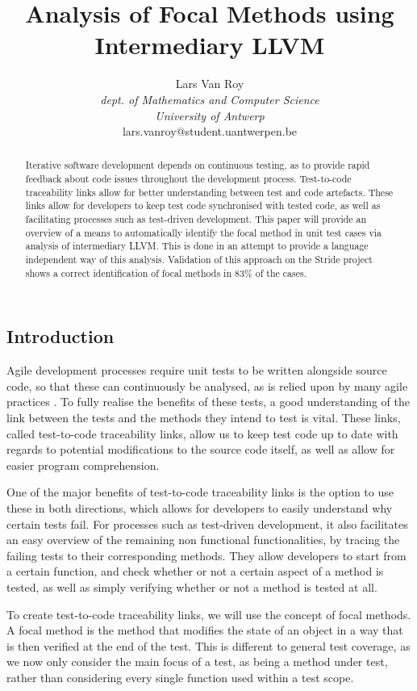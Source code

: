 \documentclass[11pt]{article}
\title{\vspace{-2cm}Analysis of Focal Methods using Intermediary LLVM}
\author{Lars Van Roy\\
\textit{dept. of Mathematics and Computer Science} \\
\textit{University of Antwerp}\\
lars.vanroy@student.uantwerpen.be}
\begin{document}
\maketitle{}

\begin{multicols}{2}

\begin{abstract}
Iterative software development depends on continuous testing, as to provide rapid feedback about code issues throughout the development process. Test-to-code traceability links allow for better understanding between test and code artefacts. These links allow for developers to keep test code synchronised with tested code, as well as facilitating processes such as test-driven development. This paper will provide an overview of a means to automatically identify the focal method in unit test cases via analysis of intermediary LLVM. This is done in an attempt to provide a language independent way of this analysis. Validation of this approach on the Stride project shows a correct identification of focal methods in 83\% of the cases.
\end{abstract}
\section{Introduction}
Agile development processes require unit tests to be written alongside source code, so that these can continuously be analysed, as is relied upon by many agile practices \cite{6298092}. To fully realise the benefits of these tests, a good understanding of the link between the tests and the methods they intend to test is vital. These links, called test-to-code traceability links, allow us to keep test code up to date with regards to potential modifications to the source code itself, as well as allow for easier program comprehension.

One of the major benefits of test-to-code traceability links is the option to use these in both directions, which allows for developers to easily understand why certain tests fail. For processes such as test-driven development, it also facilitates an easy overview of the remaining non functional functionalities, by tracing the failing tests to their corresponding methods. They allow developers to start from a certain function, and check whether or not a certain aspect of a method is tested, as well as simply verifying whether or not a method is tested at all. 

To create test-to-code traceability links, we will use the concept of focal methods. A focal method is the method that modifies the state of an object in a way that is then verified at the end of the test. This is different to general test coverage, as we now only consider the main focus of a test, as being a method under test, rather than considering every single function used within a test scope.


\end{multicols}
\end{document}
